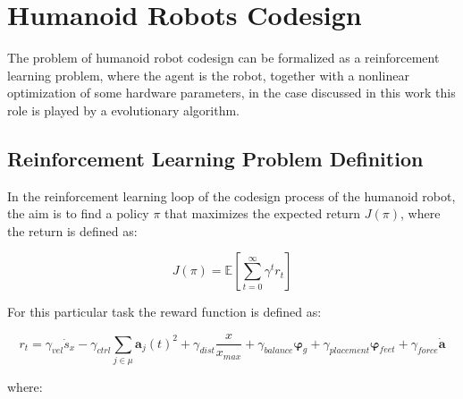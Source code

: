 \chapter{Humanoid Robots Codesign}

\label{chp:07-Codesign}

The problem of humanoid robot codesign can be formalized as a reinforcement learning problem, where the agent is the robot, together with a nonlinear optimization of some hardware parameters, in the case discussed in this work this role is played by a evolutionary algorithm.


\section{Reinforcement Learning Problem Definition}

In the reinforcement learning loop of the codesign process of the humanoid robot, the aim is to find a policy $\pi$ that maximizes the expected return $J(\pi)$, where the return is defined as:

\begin{equation}
    J(\pi) = \mathbb{E} \left[ \sum_{t=0}^{\infty} \gamma ^t r_t \right]
\end{equation}

For this particular task the reward function is defined as:

\begin{equation}
    r_t = \gamma_{vel} \dot{s}_x - \gamma_{ctrl}\sum _{j \in \mu} \mathbf{a}_j(t) ^2 + \gamma_{dist} \frac{x}{x_{max}} + \gamma_{balance} \boldsymbol{\varphi}_g + \gamma_{placement} \boldsymbol{\varphi}_{feet} + \gamma_{force} \mathbf{\dot{a}}
\end{equation}

where:

